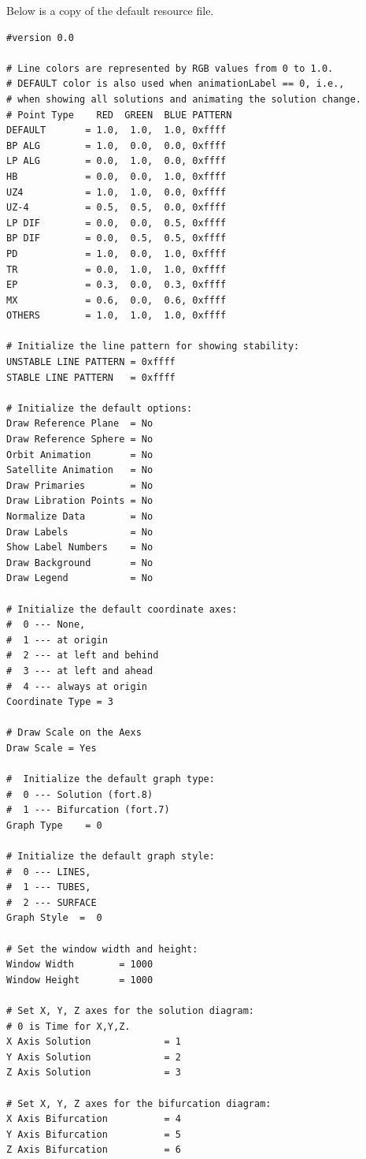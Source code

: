Below is a copy of the default resource file. 
{\footnotesize
\begin{verbatim}
#version 0.0

# Line colors are represented by RGB values from 0 to 1.0.
# DEFAULT color is also used when animationLabel == 0, i.e.,
# when showing all solutions and animating the solution change.
# Point Type    RED  GREEN  BLUE PATTERN
DEFAULT       = 1.0,  1.0,  1.0, 0xffff
BP ALG        = 1.0,  0.0,  0.0, 0xffff
LP ALG        = 0.0,  1.0,  0.0, 0xffff
HB            = 0.0,  0.0,  1.0, 0xffff
UZ4           = 1.0,  1.0,  0.0, 0xffff
UZ-4          = 0.5,  0.5,  0.0, 0xffff
LP DIF        = 0.0,  0.0,  0.5, 0xffff
BP DIF        = 0.0,  0.5,  0.5, 0xffff
PD            = 1.0,  0.0,  1.0, 0xffff
TR            = 0.0,  1.0,  1.0, 0xffff
EP            = 0.3,  0.0,  0.3, 0xffff
MX            = 0.6,  0.0,  0.6, 0xffff
OTHERS        = 1.0,  1.0,  1.0, 0xffff

# Initialize the line pattern for showing stability:
UNSTABLE LINE PATTERN = 0xffff 
STABLE LINE PATTERN   = 0xffff

# Initialize the default options:
Draw Reference Plane  = No
Draw Reference Sphere = No
Orbit Animation       = No
Satellite Animation   = No 
Draw Primaries        = No 
Draw Libration Points = No 
Normalize Data        = No
Draw Labels           = No
Show Label Numbers    = No
Draw Background       = No
Draw Legend           = No

# Initialize the default coordinate axes:
#  0 --- None,
#  1 --- at origin
#  2 --- at left and behind
#  3 --- at left and ahead
#  4 --- always at origin
Coordinate Type = 3

# Draw Scale on the Aexs
Draw Scale = Yes 

#  Initialize the default graph type:
#  0 --- Solution (fort.8)
#  1 --- Bifurcation (fort.7)
Graph Type    = 0

# Initialize the default graph style:
#  0 --- LINES,
#  1 --- TUBES,
#  2 --- SURFACE
Graph Style  =  0

# Set the window width and height:
Window Width        = 1000
Window Height       = 1000 

# Set X, Y, Z axes for the solution diagram:
# 0 is Time for X,Y,Z.
X Axis Solution             = 1
Y Axis Solution             = 2
Z Axis Solution             = 3

# Set X, Y, Z axes for the bifurcation diagram:
X Axis Bifurcation          = 4
Y Axis Bifurcation          = 5
Z Axis Bifurcation          = 6


\end{verbatim}}
